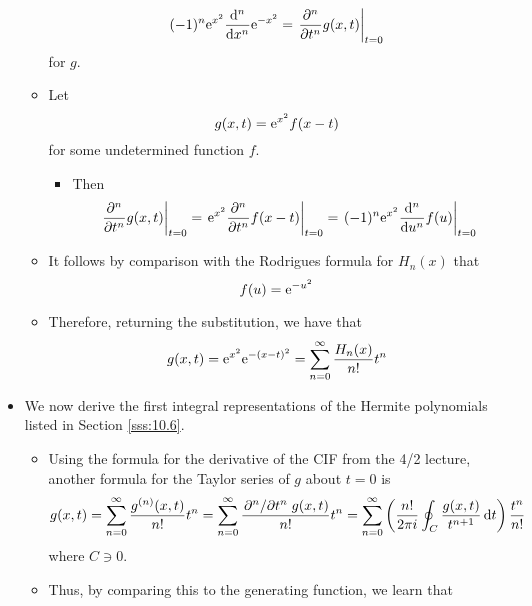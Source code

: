 \documentclass[../finalProject.tex]{subfiles}
\begin{document}
\begin{itemize}
\begin{itemize}
        \begin{equation*}
            (-1)^n\e[x^2]\dv[n]{x}\e[-x^2] = \eval{\pdv[n]{t}g(x,t)}_{t=0}
        \end{equation*}
        for $g$.
        \item Let
        \begin{equation*}
            g(x,t) = \e[x^2]f(x-t)
        \end{equation*}
        for some undetermined function $f$.
        \begin{itemize}
            \item Then
            \begin{equation*}
                \eval{\pdv[n]{t}g(x,t)}_{t=0} = \eval{\e[x^2]\pdv[n]{t}f(x-t)}_{t=0}
                = \eval{(-1)^n\e[x^2]\dv[n]{u}f(u)}_{t=0}
            \end{equation*}
        \end{itemize}
        \item It follows by comparison with the Rodrigues formula for $H_n(x)$ that
        \begin{equation*}
            f(u) = \e[-u^2]
        \end{equation*}
        \item Therefore, returning the substitution, we have that
        \begin{equation*}
            g(x,t) = \e[x^2]\e[-(x-t)^2] = \sum_{n=0}^\infty\frac{H_n(x)}{n!}t^n
        \end{equation*}
    \end{itemize}
    \pagebreak
    \item We now derive the first integral representations of the Hermite polynomials listed in Section \ref{sss:10.6}.
    \begin{itemize}
        \item Using the formula for the derivative of the CIF from the 4/2 lecture, another formula for the Taylor series of $g$ about $t=0$ is
        \begin{equation*}
            g(x,t) = \sum_{n=0}^\infty\frac{g^{(n)}(x,t)}{n!}t^n
            = \sum_{n=0}^\infty\frac{\pdv*[n]{t}g(x,t)}{n!}t^n
            = \sum_{n=0}^\infty\left( \frac{n!}{2\pi i}\oint_C\frac{g(x,t)}{t^{n+1}}\dd{t} \right)\frac{t^n}{n!}
        \end{equation*}
        where $C\ni 0$.
        \item Thus, by comparing this to the generating function, we learn that
        \begin{equation*}

\end{equation*}
\end{itemize}
\end{itemize}
\end{document}
